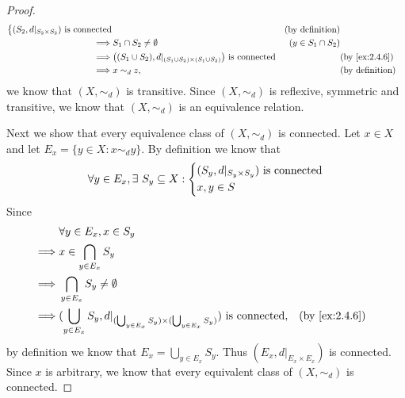 \begin{proof}
\begin{align*}
\begin{dcases}
                                                 (S_2, d|_{S_2 \times S_2}) \text{ is connected}
                                               \end{dcases}                                       &                      & \text{(by definition)}            \\
    \implies & S_1 \cap S_2 \neq \emptyset                                                              & (y \in S_1 \cap S_2)                               \\
    \implies & \big((S_1 \cup S_2), d|_{(S_1 \cup S_2) \times (S_1 \cup S_2)}\big) \text{ is connected} &                      & \text{(by \cref{ex:2.4.6})} \\
    \implies & x \sim_d z,                                                                              &                      & \text{(by definition)}
  \end{align*}
  we know that \((X, \sim_d)\) is transitive.
  Since \((X, \sim_d)\) is reflexive, symmetric and transitive, we know that \((X, \sim_d)\) is an equivalence relation.

  Next we show that every equivalence class of \((X, \sim_d)\) is connected.
  Let \(x \in X\) and let \(E_x = \{y \in X : x \sim_d y\}\).
  By definition we know that
  \[
    \forall y \in E_x, \exists\ S_y \subseteq X : \begin{dcases}
      (S_y, d|_{S_y \times S_y}) \text{ is connected} \\
      x, y \in S
    \end{dcases}
  \]
  Since
  \begin{align*}
             & \forall y \in E_x, x \in S_y                                                                                                                      \\
    \implies & x \in \bigcap_{y \in E_x} S_y                                                                                                                     \\
    \implies & \bigcap_{y \in E_x} S_y \neq \emptyset                                                                                                            \\
    \implies & (\bigcup_{y \in E_x} S_y, d|_{(\bigcup_{y \in E_x} S_y) \times (\bigcup_{y \in E_x} S_y)}) \text{ is connected}, &  & \text{(by \cref{ex:2.4.6})}
  \end{align*}
  by definition we know that \(E_x = \bigcup_{y \in E_x} S_y\).
  Thus \((E_x, d|_{E_x \times E_x})\) is connected.
  Since \(x\) is arbitrary, we know that every equivalent class of \((X, \sim_d)\) is connected.


\end{proof}
